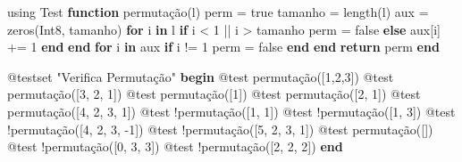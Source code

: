 \documentclass[
  letterpaper,
  DIV=11,
  numbers=noendperiod]{scrreprt}
\newenvironment{Shaded}{\begin{snugshade}}{\end{snugshade}}
\newcommand{\BuiltInTok}[1]{\textcolor[rgb]{0.00,0.23,0.31}{#1}}
\newcommand{\ConstantTok}[1]{\textcolor[rgb]{0.56,0.35,0.01}{#1}}
\newcommand{\ControlFlowTok}[1]{\textcolor[rgb]{0.00,0.23,0.31}{\textbf{#1}}}
\newcommand{\DataTypeTok}[1]{\textcolor[rgb]{0.68,0.00,0.00}{#1}}
\newcommand{\FloatTok}[1]{\textcolor[rgb]{0.68,0.00,0.00}{#1}}
\newcommand{\FunctionTok}[1]{\textcolor[rgb]{0.28,0.35,0.67}{#1}}
\newcommand{\ImportTok}[1]{\textcolor[rgb]{0.00,0.46,0.62}{#1}}
\newcommand{\KeywordTok}[1]{\textcolor[rgb]{0.00,0.23,0.31}{\textbf{#1}}}
\newcommand{\NormalTok}[1]{\textcolor[rgb]{0.00,0.23,0.31}{#1}}
\newcommand{\OperatorTok}[1]{\textcolor[rgb]{0.37,0.37,0.37}{#1}}
\newcommand{\PreprocessorTok}[1]{\textcolor[rgb]{0.68,0.00,0.00}{#1}}
\newcommand{\StringTok}[1]{\textcolor[rgb]{0.13,0.47,0.30}{#1}}
\begin{document}
\begin{Shaded}
\begin{Highlighting}[]
\ImportTok{using} \BuiltInTok{Test}
\KeywordTok{function} \FunctionTok{permutação}\NormalTok{(l)}
\NormalTok{    perm }\OperatorTok{=} \ConstantTok{true}
\NormalTok{    tamanho }\OperatorTok{=} \FunctionTok{length}\NormalTok{(l)}
\NormalTok{    aux }\OperatorTok{=} \FunctionTok{zeros}\NormalTok{(}\DataTypeTok{Int8}\NormalTok{, tamanho)}
    \ControlFlowTok{for}\NormalTok{ i }\KeywordTok{in}\NormalTok{ l}
      \ControlFlowTok{if}\NormalTok{ i }\OperatorTok{\textless{}} \FloatTok{1} \OperatorTok{||}\NormalTok{ i }\OperatorTok{\textgreater{}}\NormalTok{ tamanho}
\NormalTok{        perm }\OperatorTok{=} \ConstantTok{false}
      \ControlFlowTok{else}
\NormalTok{        aux[i] }\OperatorTok{+=} \FloatTok{1}
      \ControlFlowTok{end}
    \ControlFlowTok{end}
    \ControlFlowTok{for}\NormalTok{ i }\KeywordTok{in}\NormalTok{ aux}
      \ControlFlowTok{if}\NormalTok{ i }\OperatorTok{!=} \FloatTok{1}
\NormalTok{        perm }\OperatorTok{=} \ConstantTok{false}
      \ControlFlowTok{end}
    \ControlFlowTok{end}  
    \ControlFlowTok{return}\NormalTok{ perm}
\KeywordTok{end}

\PreprocessorTok{@testset} \StringTok{"Verifica Permutação"} \ControlFlowTok{begin}
    \PreprocessorTok{@test} \FunctionTok{permutação}\NormalTok{([}\FloatTok{1}\NormalTok{,}\FloatTok{2}\NormalTok{,}\FloatTok{3}\NormalTok{])}
    \PreprocessorTok{@test} \FunctionTok{permutação}\NormalTok{([}\FloatTok{3}\NormalTok{, }\FloatTok{2}\NormalTok{, }\FloatTok{1}\NormalTok{])}
    \PreprocessorTok{@test} \FunctionTok{permutação}\NormalTok{([}\FloatTok{1}\NormalTok{])}
    \PreprocessorTok{@test} \FunctionTok{permutação}\NormalTok{([}\FloatTok{2}\NormalTok{, }\FloatTok{1}\NormalTok{])}
    \PreprocessorTok{@test} \FunctionTok{permutação}\NormalTok{([}\FloatTok{4}\NormalTok{, }\FloatTok{2}\NormalTok{, }\FloatTok{3}\NormalTok{, }\FloatTok{1}\NormalTok{])}
    \PreprocessorTok{@test}\NormalTok{ !}\FunctionTok{permutação}\NormalTok{([}\FloatTok{1}\NormalTok{, }\FloatTok{1}\NormalTok{])}
    \PreprocessorTok{@test}\NormalTok{ !}\FunctionTok{permutação}\NormalTok{([}\FloatTok{1}\NormalTok{, }\FloatTok{3}\NormalTok{])}
    \PreprocessorTok{@test}\NormalTok{ !}\FunctionTok{permutação}\NormalTok{([}\FloatTok{4}\NormalTok{, }\FloatTok{2}\NormalTok{, }\FloatTok{3}\NormalTok{, }\OperatorTok{{-}}\FloatTok{1}\NormalTok{])}
    \PreprocessorTok{@test}\NormalTok{ !}\FunctionTok{permutação}\NormalTok{([}\FloatTok{5}\NormalTok{, }\FloatTok{2}\NormalTok{, }\FloatTok{3}\NormalTok{, }\FloatTok{1}\NormalTok{])}
    \PreprocessorTok{@test} \FunctionTok{permutação}\NormalTok{([])}
    \PreprocessorTok{@test}\NormalTok{ !}\FunctionTok{permutação}\NormalTok{([}\FloatTok{0}\NormalTok{, }\FloatTok{3}\NormalTok{, }\FloatTok{3}\NormalTok{])}
    \PreprocessorTok{@test}\NormalTok{ !}\FunctionTok{permutação}\NormalTok{([}\FloatTok{2}\NormalTok{, }\FloatTok{2}\NormalTok{, }\FloatTok{2}\NormalTok{])}
\ControlFlowTok{end}
\end{Highlighting}
\end{Shaded}
\end{document}
